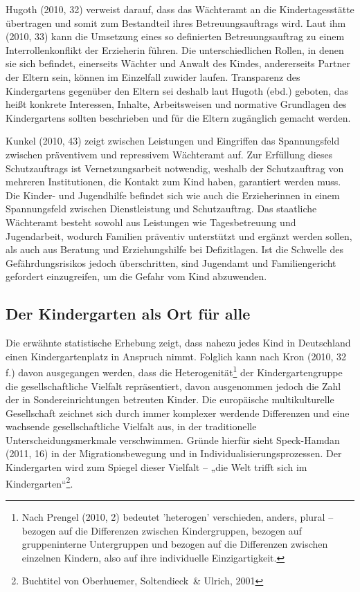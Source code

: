 Hugoth (2010, 32) verweist darauf, dass das Wächteramt an die Kindertagesstätte übertragen und somit zum Bestandteil ihres Betreuungsauftrags wird. Laut ihm (2010, 33) kann die Umsetzung eines so definierten Betreuungsauftrag zu einem Interrollenkonflikt der Erzieherin führen. Die unterschiedlichen Rollen, in denen sie sich befindet, einerseits Wächter und Anwalt des Kindes, andererseits Partner der Eltern sein, können im Einzelfall zuwider laufen. Transparenz des Kindergartens gegenüber den Eltern sei deshalb laut Hugoth (ebd.) geboten, das heißt konkrete Interessen, Inhalte, Arbeitsweisen und normative Grundlagen des Kindergartens sollten beschrieben und für die Eltern zugänglich gemacht werden. 

Kunkel (2010, 43) zeigt zwischen Leistungen und Eingriffen das Spannungsfeld zwischen präventivem und repressivem Wächteramt auf. Zur Erfüllung dieses Schutzauftrags ist Vernetzungsarbeit notwendig, weshalb der Schutzauftrag von mehreren Institutionen, die Kontakt zum Kind haben, garantiert werden muss.
Die Kinder- und Jugendhilfe befindet sich wie auch die Erzieherinnen in einem Spannungsfeld zwischen Dienstleistung und Schutzauftrag. Das staatliche Wächteramt besteht sowohl aus Leistungen wie Tagesbetreuung und Jugendarbeit, wodurch Familien präventiv unterstützt und ergänzt werden sollen, als auch aus Beratung und Erziehungshilfe bei Defizitlagen. Ist die Schwelle des Gefährdungsrisikos jedoch überschritten, sind Jugendamt und Familiengericht gefordert einzugreifen, um die Gefahr vom Kind abzuwenden. 

\subsection{Der Kindergarten als Ort für alle}\label{OrtFuerAlle}
Die erwähnte statistische Erhebung zeigt, dass nahezu jedes Kind in Deutschland einen Kindergartenplatz in Anspruch nimmt. Folglich kann nach Kron (2010, 32 f.) davon ausgegangen werden, dass die Heterogenität\footnote{Nach Prengel (2010, 2) bedeutet 'heterogen' verschieden, anders, plural – bezogen auf die Differenzen zwischen Kindergruppen, bezogen auf gruppeninterne Untergruppen und bezogen auf die Differenzen zwischen einzelnen Kindern, also auf ihre individuelle Einzigartigkeit.}
der Kindergartengruppe die gesellschaftliche Vielfalt repräsentiert, davon ausgenommen jedoch die Zahl der in Sondereinrichtungen betreuten Kinder. Die europäische multikulturelle Gesellschaft zeichnet sich durch immer komplexer werdende Differenzen und eine wachsende gesellschaftliche Vielfalt aus, in der traditionelle Unterscheidungsmerkmale verschwimmen. Gründe hierfür sieht Speck-Hamdan (2011, 16) in der Migrationsbewegung und in Individualisierungsprozessen. Der Kindergarten wird zum Spiegel dieser Vielfalt – „die Welt trifft sich im Kindergarten“\footnote{Buchtitel von Oberhuemer, Soltendieck~\& Ulrich, 2001}.
 
